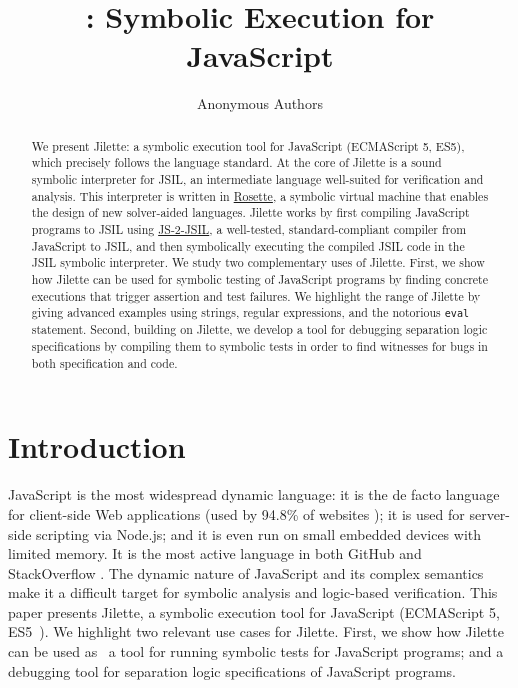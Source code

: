 \documentclass[a4paper,UKenglish]{lipics-v2016}
\title{\jilette: Symbolic Execution for JavaScript}
\author[1]{Anonymous Authors}
\def\jsinline{\lstinline[language=JavaScript, basicstyle=\small]}
\newcommand{\jsil}{JSIL\xspace}
\newcommand{\JSComp}{JS-2-JSIL\xspace}
\newcommand{\jilette}{Jilette\xspace}
\begin{document}
%

\maketitle 

\begin{abstract}
We present \jilette: a symbolic execution tool for JavaScript (ECMAScript 5, ES5), which precisely follows the language standard. At the core of \jilette is a sound symbolic interpreter for \jsil, an intermediate language well-suited for verification and analysis. This interpreter is written in \underline{Rosette}, %
a symbolic virtual machine that enables the design of new solver-aided languages. 
\jilette works by first compiling JavaScript programs to \jsil using \underline{\JSComp}, %
a well-tested, standard-compliant compiler from JavaScript to \jsil, and then symbolically executing the compiled \jsil code in the \jsil symbolic interpreter. 
We study two complementary uses of \jilette. 
First, we show how \jilette can be used for symbolic testing of JavaScript programs by finding concrete executions that trigger assertion and test failures. 
We highlight the range of \jilette by giving advanced examples using strings, regular expressions, and the notorious \jsinline|eval| statement.
Second, building on \jilette, we develop a tool for debugging separation logic specifications by compiling them to symbolic tests in order to find 
witnesses for bugs in both specification and code.
\vspace*{-0.4cm}
\end{abstract}

\section{Introduction}

\vspace*{-0.2cm}
JavaScript is the most widespread dynamic language: it is the de facto language for client-side Web applications (used by 94.8\% of websites \cite{JS948percent});
it is used for server-side scripting via Node.js; and it is even run on small embedded devices with limited 
memory. It is the most active language in both GitHub \cite{GithubActive} and StackOverflow \cite{SOActive}.
The dynamic nature of JavaScript and its complex semantics make it a difficult target for
symbolic analysis and logic-based verification. 
This paper presents \jilette, a symbolic execution tool for JavaScript (ECMAScript 5, ES5~\cite{ecma}).
%
We highlight two relevant use cases for \jilette. First, we show how \jilette can be used as ~a tool for running symbolic tests for JavaScript programs; and  a debugging tool for separation logic specifications of JavaScript programs. 
\end{document}
